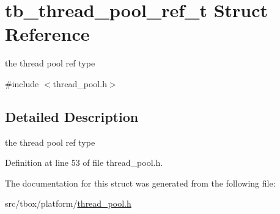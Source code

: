\hypertarget{structtb__thread__pool__ref__t}{\section{tb\-\_\-thread\-\_\-pool\-\_\-ref\-\_\-t Struct Reference}
\label{structtb__thread__pool__ref__t}
}


the thread pool ref type  




{\ttfamily \#include $<$thread\-\_\-pool.\-h$>$}



\subsection{Detailed Description}
the thread pool ref type 

Definition at line 53 of file thread\-\_\-pool.\-h.



The documentation for this struct was generated from the following file\-:\begin{DoxyCompactItemize}
\item 
src/tbox/platform/\hyperlink{thread__pool_8h}{thread\-\_\-pool.\-h}\end{DoxyCompactItemize}

